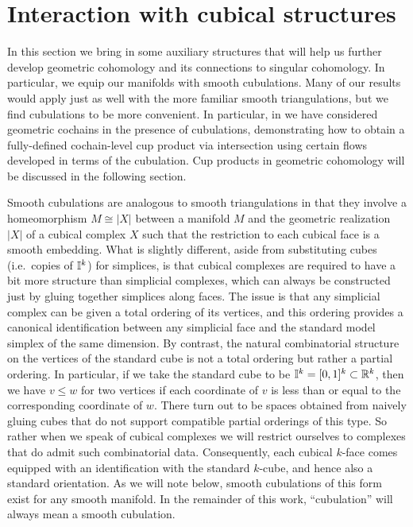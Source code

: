 







\section{Interaction with cubical structures}
\label{S: transversality} 

In this section we bring in some auxiliary structures that will help us further develop geometric cohomology and its connections to singular cohomology. In particular, we equip our manifolds with smooth cubulations. Many of our results would apply just as well with the more familiar smooth triangulations, but we find cubulations to be more convenient. In particular, in \cite{FMS-flows} we have considered geometric cochains in the presence of cubulations, demonstrating how to obtain a fully-defined cochain-level cup product via intersection using certain flows developed in terms of the cubulation. Cup products in geometric cohomology will be discussed in the following section. 

Smooth cubulations are analogous to smooth triangulations in that they involve a homeomorphism $M\cong |X|$ between a manifold $M$ and the geometric realization $|X|$ of a cubical complex $X$ such that the restriction to each cubical face is a smooth embedding. What is slightly different, aside from substituting cubes (i.e.\ copies of $\mathbb{I}^k$) for simplices, is that cubical complexes are required to have a bit more structure than simplicial complexes, which can always be constructed just by gluing together simplices along faces. The issue is that any simplicial complex can be given a total ordering of its vertices, and this ordering provides a canonical identification between any simplicial face and the standard model simplex of the same dimension. By contrast, the natural combinatorial structure on the vertices of the standard cube is not a total ordering but rather a partial ordering. In particular, if we take the standard cube to be $\mathbb{I}^k=[0,1]^k\subset \mathbb{R}^k$, then we have $v\leq w$ for two vertices if each coordinate of $v$ is less than or equal to the corresponding coordinate of $w$. There turn out to be spaces obtained from naively gluing cubes that do not support compatible partial orderings of this type. So rather when we speak of cubical complexes we will restrict ourselves to complexes that do admit such combinatorial data. 
Consequently, each cubical $k$-face comes equipped with an identification with the standard $k$-cube, and hence also a standard orientation. As we will note below, smooth cubulations of this form exist for any smooth manifold. In the remainder of this work, ``cubulation'' will always mean a smooth cubulation. 

